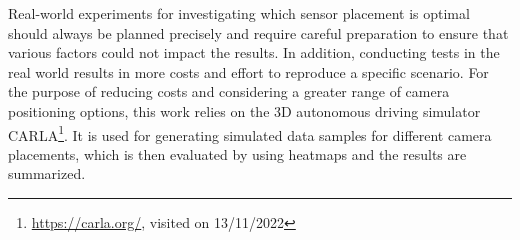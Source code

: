 Real-world experiments for investigating which sensor placement is optimal should always be planned precisely and require careful preparation to ensure that various factors could not impact the results. In addition, conducting tests in the real world results in more costs and effort to reproduce a specific scenario. For the purpose of reducing costs and considering a greater range of camera positioning options, this work relies on the 3D autonomous driving simulator CARLA\footnote{\url{https://carla.org/}, visited on 13/11/2022}. It is used for generating simulated data samples for different camera placements, which is then evaluated by using heatmaps and the results are summarized.



